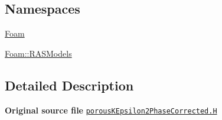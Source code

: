 \subsection*{Namespaces}
\begin{DoxyCompactItemize}
\item 
 \hyperlink{namespaceFoam}{Foam}
\item 
 \hyperlink{namespaceFoam_1_1RASModels}{Foam\+::\+R\+A\+S\+Models}
\end{DoxyCompactItemize}


\subsection{Detailed Description}
{\bfseries Original source file} \href{../../../home/carlo/data/GeN-Foam/GeN-Foam_ffn/GeN-Foam/GeN-Foam/classes/thermalHydraulics/src/physicsModels/turbulenceModels/porousKEpsilon2PhaseCorrected/porousKEpsilon2PhaseCorrected.H}{\tt porous\+K\+Epsilon2\+Phase\+Corrected.\+H} 